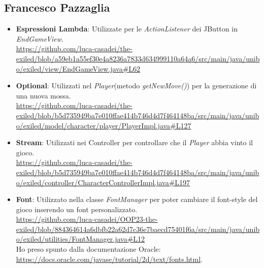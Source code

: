 \documentclass[a4paper,12pt]{report}
\begin{document}
\subsection{Francesco Pazzaglia}

\begin{itemize}
	\item \textbf{Espressioni Lambda}: Utilizzate per le \textit{ActionListener} dei JButton in \textit{EndGameView}. \\
	\url{https://github.com/luca-casadei/the-exiled/blob/a59eb1a55ef30e4a8236a7833d634999110a64a6/src/main/java/unibo/exiled/view/EndGameView.java#L62}
	
	\item \textbf{Optional}: Utilizzati nel \textit{Player}(metodo \textit{getNewMove()}) per la generazione di una nuova mossa. \\
	\url{https://github.com/luca-casadei/the-exiled/blob/b5d735949ba7e010ffae414b746d4d7f464148ba/src/main/java/unibo/exiled/model/character/player/PlayerImpl.java#L127}
	
	\item \textbf{Stream}: Utilizzati nei Controller per controllare che il \textit{Player} abbia vinto il gioco. \\
	\url{https://github.com/luca-casadei/the-exiled/blob/b5d735949ba7e010ffae414b746d4d7f464148ba/src/main/java/unibo/exiled/controller/CharacterControllerImpl.java#L197}
	
	\item \textbf{Font}: Utilizzato nella classe \textit{FontManager} per poter cambiare il font-style del gioco inserendo un font personalizzato. \\
	\url{https://github.com/luca-casadei/OOP23-the-exiled/blob/884364614a6dbfb22a62d7c36e7baecd75401f6a/src/main/java/unibo/exiled/utilities/FontManager.java#L12} \\
	Ho preso spunto dalla documentazione Oracle: \\ \url{https://docs.oracle.com/javase/tutorial/2d/text/fonts.html}.
\end{itemize}
\end{document}
